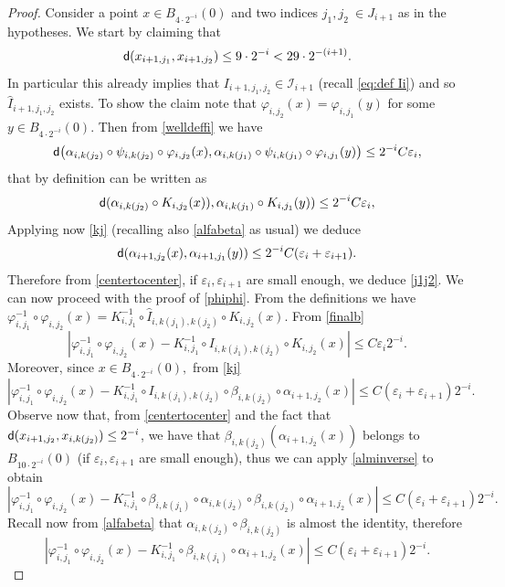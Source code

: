 \documentclass[11pt]{article}
\newcommand{\eps}{\varepsilon}
\newcommand{\sfd}{{\sf d}}
\renewcommand{\phi}{\varphi}
\theoremstyle{plain}
\theoremstyle{definition}
\numberwithin{equation}{section}
\begin{document}
\begin{proof}
	Consider a point $x \in B_{4\cdot 2^{-i}}(0)$ and two indices $j_1,j_2\ \in J_{i+1}$ as in the hypotheses. We start by claiming that 
	\begin{equation}\label{j1j2}
		\sfd(x_{i+1,j_1},x_{i+1,j_2})\le 9\cdot 2^{-i}<29\cdot 2^{-(i+1)}. 
	\end{equation}
 In particular this already implies that $I_{i+1,j_1,j_2}\in \mathcal I_{i+1}$ (recall \eqref{eq:def Ii}) and so $\hat I_{i+1,j_1,j_2}$ exists.
	To show the claim note that  $\phi_{i,j_2}(x)=\phi_{i,j_1}(y)$ for some $y \in B_{4\cdot 2^{-i}}(0).$  Then from \eqref{welldeffi} we have
	\[ \sfd\big(\alpha_{i,k(j_2)}\circ \psi_{i,k(j_2)}\circ \phi_{i,j_2}(x),\alpha_{i,k(j_1)}\circ \psi_{i,k(j_1)}\circ \phi_{i,j_1}(y)\big)\le 2^{-i}C\eps_i,\]
	that by definition can be written as
	\[ \sfd(\alpha_{i,k(j_2)}\circ K_{i,j_2}(x)),\alpha_{i,k(j_1)}\circ K_{i,j_1}(y))\le 2^{-i}C\eps_i,\]
	Applying now \eqref{kj} (recalling also \eqref{alfabeta} as usual) we deduce
	\begin{equation}\label{aj1j2}
		\sfd(\alpha_{i+1,j_2}(x),\alpha_{i+1,j_1}(y))\le 2^{-i}C(\eps_i+\eps_{i+1}).
	\end{equation}
	Therefore from \eqref{centertocenter}, if $\eps_i,\eps_{i+1}$ are small enough, we deduce \eqref{j1j2}. We can now proceed with the proof of \eqref{phiphi}.
	From the definitions we have
	$\phi_{i,j_1}^{-1}\circ \phi_{i,j_2}(x)=K_{i,j_1}^{-1}\circ \hat I_{i,k(j_1),k(j_2)}\circ K_{i,j_2}(x).$ 
	From \eqref{finalb}  
	\[|\phi_{i,j_1}^{-1}\circ \phi_{i,j_2}(x)- K_{i,j_1}^{-1}\circ I_{i,k(j_1),k(j_2)}\circ  K_{i,j_2}(x)|\le C\eps_i2^{-i}.\]
	Moreover, since $x \in B_{4\cdot 2^{-i}}(0),$ from \eqref{kj} 
	\[|\phi_{i,j_1}^{-1}\circ \phi_{i,j_2}(x)- K_{i,j_1}^{-1}\circ I_{i,k(j_1),k(j_2)}\circ \beta_{i,k(j_2)}\circ \alpha_{i+1,j_2}(x)|\le C(\eps_i+\eps_{i+1})2^{-i}.\]
	Observe  now that, from \eqref{centertocenter} and the fact that $\sfd(x_{i+1,j_2},x_{i,k(j_2)})\le 2^{-i}$, we have that $\beta_{i,k(j_2)}(\alpha_{i+1,j_2}(x))$ belongs to $B_{10\cdot 2^{-i}}(0)$ (if $\eps_i,\eps_{i+1}$ are small enough), thus we can apply \eqref{alminverse} to obtain
	\[|\phi_{i,j_1}^{-1}\circ \phi_{i,j_2}(x)- K_{i,j_1}^{-1}\circ \beta_{i,k(j_1)}\circ \alpha_{i,k(j_2)}\circ \beta_{i,k(j_2)}\circ \alpha_{i+1,j_2}(x)|\le C(\eps_i+\eps_{i+1})2^{-i}.\]
	Recall now from  \eqref{alfabeta} that  $\alpha_{i,k(j_2)}\circ \beta_{i,k(j_2)}$ is almost the identity, therefore
	\[|\phi_{i,j_1}^{-1}\circ \phi_{i,j_2}(x)-  K_{i,j_1}^{-1}\circ \beta_{i,k(j_1)}\circ \alpha_{i+1,j_2}(x)|\le C(\eps_i+\eps_{i+1})2^{-i}.\]

\end{proof}
\end{document}

